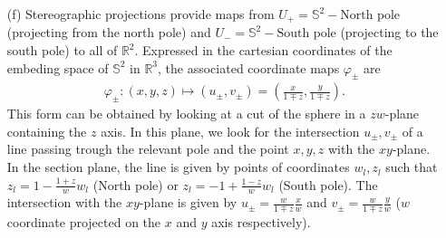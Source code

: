 \documentclass[10pt, a4paper]{article}
\begin{document}
{\begin{enumerate}
  \item[(f)] Stereographic projections provide maps from $U_{+} = \mathbb{S}^2-\text{North pole}$ (projecting from the north pole) and $U_{-} = \mathbb{S}^2-\text{South pole}$ (projecting to the south pole) to all of $\mathbb{R}^2$. Expressed in the cartesian coordinates of the embeding space of $\mathbb{S}^2$ in $\mathbb{R}^3$, the associated coordinate maps $\varphi_{\pm}$ are 
  \begin{align*}
    \varphi_\pm : (x, y, z) \mapsto (u_\pm, v_\pm) = \left(\frac{x}{1\mp z}, \frac{y}{1\mp z}\right).
  \end{align*} 
  This form can be obtained by looking at a cut of the sphere in a $zw$-plane containing the $z$ axis. In this plane, we look for the intersection $u_\pm, v_\pm$ of a line passing trough the relevant pole and the point $x, y, z$ with the $xy$-plane. In the section plane, the line is given by points of coordinates $w_l, z_l$ such that $z_l = 1 - \frac{1+z}{w}w_l$ (North pole) or $z_l = -1 + \frac{1-z}{w} w_l$ (South pole). The intersection with the $xy$-plane is given by $u_\pm =\frac{w}{1\mp z} \frac{x}{w}$ and $v_\pm = \frac{w}{1\mp z} \frac{y}{w}$ ($w$ coordinate projected on the $x$ and $y$ axis respectively).


\end{enumerate}}
\end{document}
